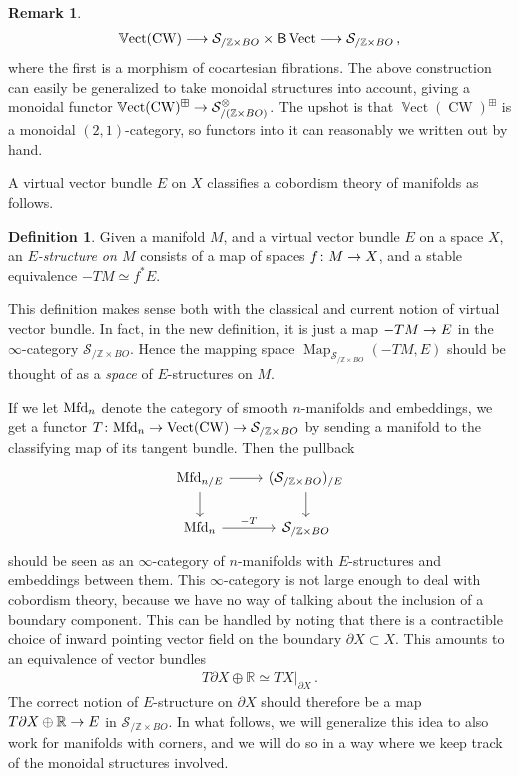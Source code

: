 \documentclass[10pt]{amsart}
\numberwithin{equation}{section}
\theoremstyle{definition}
\newtheorem{definition}[prop]{Definition}
\newtheorem{rem}[prop]{Remark}
\DeclareMathOperator{\Map}{Map}
\DeclareMathOperator{\Vect}{Vect}
\DeclareMathOperator{\bVect}{\mathbb{V}ect}
\DeclareMathOperator{\CW}{CW}
\newcommand{\Mfd}{\mathrm{Mfd}\vphantom{d}}
\newcommand{\bZ}{\mathbb{Z}}
\newcommand{\bR}{\mathbb{R}}
\newcommand{\cS}{\mathcal{S}}
\newcommand{\sfB}{\mathsf{B}}
\newcommand{\del}{\partial}
\renewcommand{\to}{\mathchoice{\longrightarrow}{\rightarrow}{}{}}
\begin{document}
\begin{rem}
	\begin{align*}
		\bVect(\CW) \to \cS_{/ \bZ\times BO} \times \sfB \Vect \to \cS_{/\bZ\times BO} \,,
	\end{align*}
	where the first is a morphism of cocartesian fibrations. The above construction can easily be generalized to take monoidal structures into account, giving a monoidal functor $\bVect(\CW)^{\boxplus}\to \cS_{/ (\bZ\times BO)}^{\otimes}$. The upshot is that $\bVect(\CW)^{\boxplus}$ is a monoidal $(2,1)$-category, so functors into it can reasonably we written out by hand.
\end{rem}


A virtual vector bundle $E$ on $X$ classifies a cobordism theory of manifolds as follows.

\begin{definition}\label{def:stable_normal_orientation}
	Given a manifold $M$, and a virtual vector bundle $E$ on a space $X$, an \emph{$E$-structure on $M$} consists of a map of spaces $f\colon M \to X$, and a stable equivalence $-TM \simeq f^{*}E$.
\end{definition}

This definition makes sense both with the classical and current notion of virtual vector bundle.
In fact, in the new definition, it is just a map $-TM \to E$ in the $\infty$-category $\cS_{/\bZ\times BO}$.
Hence the mapping space $\Map_{\cS_{/\bZ\times BO}}(-TM, E)$ should be thought of as a \emph{space} of $E$-structures on $M$.


If we let $\Mfd_{n}$ denote the category of smooth $n$-manifolds and embeddings, we get a functor $T\colon \Mfd_{n}\to \Vect(\CW) \to \cS_{/\bZ\times BO}$ by sending a manifold to the classifying map of its tangent bundle.
Then the pullback
\begin{equation*}
	\begin{tikzcd}
		\Mfd_{n/E} \arrow[r] \arrow[d]      &   (\cS_{/\bZ\times BO})_{/E}  \arrow[d] \\
		\Mfd_{n}  \arrow[r, "-T"]               &   \cS_{/\bZ\times BO}
	\end{tikzcd}
\end{equation*}
should be seen as an $\infty$-category of $n$-manifolds with $E$-structures and embeddings between them.
This $\infty$-category is not large enough to deal with cobordism theory, because we have no way of talking about the inclusion of a boundary component.
This can be handled by noting that there is a contractible choice of inward pointing vector field on the boundary $\del X\subset X$.
This amounts to an equivalence of vector bundles
\begin{align*}
	T\del X \oplus \bR \simeq TX\vert_{\del X} \,.
\end{align*}
The correct notion of $E$-structure on $\del X$ should therefore be a map $T\del X \oplus \bR \to E$ in $\cS_{/\bZ\times BO}$.
In what follows, we will generalize this idea to also work for manifolds with corners, and we will do so in a way where we keep track of the monoidal structures involved.
\end{document}

